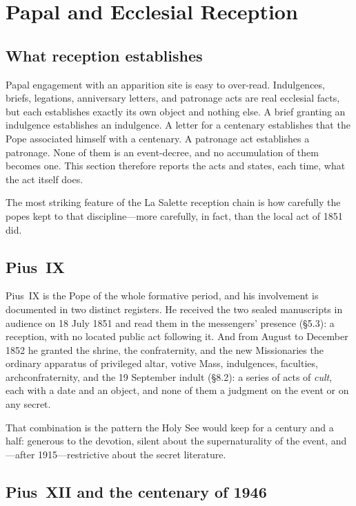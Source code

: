 \section{Papal and Ecclesial Reception}

\subsection{What reception establishes}

Papal engagement with an apparition site is easy to over-read.
Indulgences, briefs, legations, anniversary letters, and patronage
acts are real ecclesial facts, but each establishes exactly its own
object and nothing else. A brief granting an indulgence establishes
an indulgence. A letter for a centenary establishes that the Pope
associated himself with a centenary. A patronage act establishes a
patronage. None of them is an event-decree, and no accumulation of
them becomes one. This section therefore reports the acts and states,
each time, what the act itself does.

The most striking feature of the La Salette reception chain is how
carefully the popes kept to that discipline---more carefully, in
fact, than the local act of 1851 did.

\subsection{Pius~IX}

Pius~IX is the Pope of the whole formative period, and his
involvement is documented in two distinct registers. He received the
two sealed manuscripts in audience on 18 July 1851 and read them in
the messengers' presence (\S5.3): a reception, with no located
public act following it. And from August to December 1852 he granted
the shrine, the confraternity, and the new Missionaries the ordinary
apparatus of privileged altar, votive Mass, indulgences, faculties,
archconfraternity, and the 19 September indult (\S8.2): a series of
acts of \emph{cult}, each with a date and an object, and none of them
a judgment on the event or on any secret.

That combination is the pattern the Holy See would keep for a
century and a half: generous to the devotion, silent about the
supernaturality of the event, and---after 1915---restrictive about
the secret literature.

\subsection{Pius~XII and the centenary of 1946}

